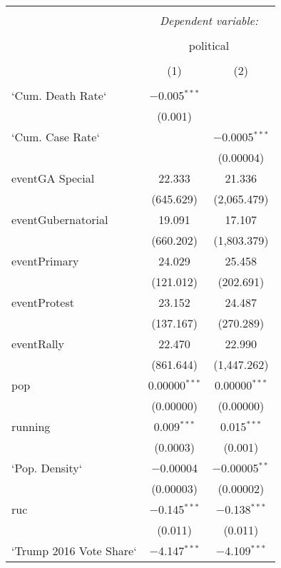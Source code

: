 
\begin{table}[!htbp] \centering 
  \caption{} 
  \label{} 
\tiny 
\begin{tabular}{@{\extracolsep{5pt}}lcc} 
\\[-1.8ex]\hline 
\hline \\[-1.8ex] 
 & \multicolumn{2}{c}{\textit{Dependent variable:}} \\ 
\cline{2-3} 
\\[-1.8ex] & \multicolumn{2}{c}{political} \\ 
\\[-1.8ex] & (1) & (2)\\ 
\hline \\[-1.8ex] 
 `Cum. Death Rate` & $-$0.005$^{***}$ &  \\ 
  & (0.001) &  \\ 
  `Cum. Case Rate` &  & $-$0.0005$^{***}$ \\ 
  &  & (0.00004) \\ 
  eventGA Special & 22.333 & 21.336 \\ 
  & (645.629) & (2,065.479) \\ 
  eventGubernatorial & 19.091 & 17.107 \\ 
  & (660.202) & (1,803.379) \\ 
  eventPrimary & 24.029 & 25.458 \\ 
  & (121.012) & (202.691) \\ 
  eventProtest & 23.152 & 24.487 \\ 
  & (137.167) & (270.289) \\ 
  eventRally & 22.470 & 22.990 \\ 
  & (861.644) & (1,447.262) \\ 
  pop & 0.00000$^{***}$ & 0.00000$^{***}$ \\ 
  & (0.00000) & (0.00000) \\ 
  running & 0.009$^{***}$ & 0.015$^{***}$ \\ 
  & (0.0003) & (0.001) \\ 
  `Pop. Density` & $-$0.00004 & $-$0.00005$^{**}$ \\ 
  & (0.00003) & (0.00002) \\ 
  ruc & $-$0.145$^{***}$ & $-$0.138$^{***}$ \\ 
  & (0.011) & (0.011) \\ 
  `Trump 2016 Vote Share` & $-$4.147$^{***}$ & $-$4.109$^{***}$ \\ 

\end{tabular}
\end{table}
